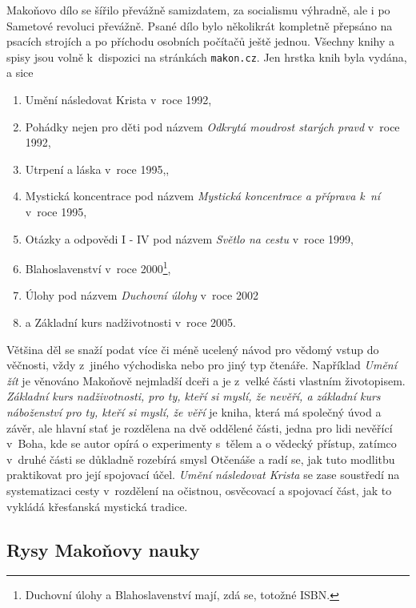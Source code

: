 Makoňovo dílo se šířilo převážně samizdatem, za socialismu výhradně, ale i po
Sametové revoluci převážně. Psané dílo bylo několikrát kompletně přepsáno na
psacích strojích a po příchodu osobních počítačů ještě jednou. Všechny knihy a
spisy jsou volně k~dispozici na stránkách \texttt{makon.cz}. Jen hrstka knih
byla vydána, a sice
\begin{enumerate}
\item{Umění následovat Krista v~roce 1992\cite{makon1995umeni},}
\item{
    Pohádky nejen pro děti pod názvem {\em Odkrytá moudrost starých
    pravd}\cite{makon1992odkryta} v~roce 1992,
}
\item{Utrpení a láska v~roce 1995\cite{makon1995utrpeni},},
\item{
    Mystická koncentrace pod názvem
    {\em Mystická koncentrace a příprava k~ní}
    v~roce 1995\cite{makon1995mysticka},
}
\item{
    Otázky a odpovědi I - IV pod názvem {\em Světlo na cestu}
    v~roce 1999\cite{makon1999svetlo},
}
\item{
    Blahoslavenství v~roce
    2000\cite{makon2000blahoslavenstvi}\footnote{\label{note1}
        Duchovní úlohy a Blahoslavenství mají, zdá se, totožné ISBN.
    },
}
\item{
    Úlohy pod názvem {\em Duchovní úlohy} v~roce
    2002\cite{makon2002ulohy}\footnotemark[\ref{note1}]
}
\item{a Základní kurs nadživotnosti v~roce 2005\cite{makon2005zakladni}.}
\end{enumerate}

Většina děl se snaží podat více či méně ucelený návod pro vědomý vstup do
věčnosti, vždy z~jiného východiska nebo pro jiný typ čtenáře. Například {\em Umění
žít} je věnováno Makoňově nejmladší dceři a je z~velké části vlastním
životopisem. {\em Základní kurs nadživotnosti, pro ty, kteří si myslí, že nevěří, a
základní kurs náboženství pro ty, kteří si myslí, že věří} je kniha, která má
společný úvod a závěr, ale hlavní stať je rozdělena na dvě oddělené části, jedna
pro lidi nevěřící v~Boha, kde se autor opírá o experimenty s~tělem a o vědecký
přístup, zatímco v~druhé části se důkladně rozebírá smysl Otčenáše a radí se,
jak tuto modlitbu praktikovat pro její spojovací účel. {\em Umění následovat
Krista} se zase soustředí na systematizaci cesty v~rozdělení na očistnou,
osvěcovací a spojovací část, jak to vykládá křesťanská mystická tradice.

\subsection{Rysy Makoňovy nauky}

